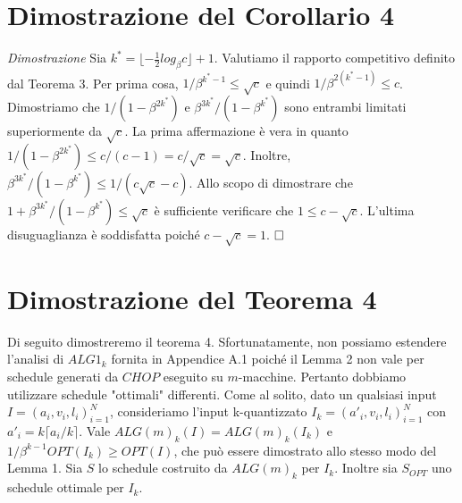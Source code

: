 \documentclass[twoside,openany,titlepage,fleqn,
	headinclude,12pt,a4paper,BCOR5mm,footinclude]{scrbook}
\begin{document}
\section{Dimostrazione del Corollario 4}
\textit{Dimostrazione}
Sia $k^{*}  = \lfloor -\frac{1}{2} log_{\beta} c \rfloor + 1$. Valutiamo il rapporto competitivo definito dal Teorema 3. Per prima cosa, $1 / \beta^{k^{*}-1} \leq \sqrt{c}$ e quindi $1 / \beta^{2 (k^{*}  -1)} \leq c$. Dimostriamo che $1 / (1 - \beta^{2k^{*}})$ e $\beta^{3k^{*}} / (1 - \beta^{k^{*}})$ sono entrambi limitati superiormente da $\sqrt{c}$. La prima affermazione è vera in quanto $1 / (1 - \beta^{2k^{*}}) \leq c / (c - 1) = c / \sqrt{c} = \sqrt{c}$. Inoltre, $\beta^{3k^{*}} / (1 - \beta^{k^{*}}) \leq 1 / (c\sqrt{c} - c)$. Allo scopo di dimostrare che $1 + \beta^{3k^{*}} / (1 - \beta^{k^{*}}) \leq \sqrt{c}$ è sufficiente verificare che $1 \leq c - \sqrt{c}$. L'ultima disuguaglianza è soddisfatta poiché $c - \sqrt{c} = 1$. $\hfill \square$

\section{Dimostrazione del Teorema 4}
Di seguito dimostreremo il teorema 4. Sfortunatamente, non possiamo estendere l'analisi di $ALG1_{k}$ fornita in Appendice A.1 poiché il Lemma 2 non vale per schedule generati da $CHOP$ eseguito su $m$-macchine. Pertanto dobbiamo utilizzare schedule "ottimali" differenti.
Come al solito, dato un qualsiasi input $I = (a_{i}, v_{i}, l_{i})^{N}_{i = 1}$, consideriamo l'input k-quantizzato $I_{k} = (a'_{i}, v_{i}, l_{i})^{N}_{i = 1}$ con $a'_{i} = k \lceil a_{i} / k \rceil$. Vale $ALG(m)_{k}(I) = ALG(m)_{k}(I_{k})$ e $1 / \beta^{k-1}OPT (I_{k}) \geq OPT (I)$, che può essere dimostrato allo stesso modo del Lemma 1. Sia $S$ lo schedule costruito da $ALG(m)_{k}$ per $I_{k}$. Inoltre sia $S_{OPT}$ uno schedule ottimale per $I_{k}$. 
\end{document}
